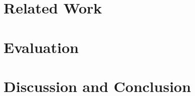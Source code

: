 \documentclass[10pt,b5paper,twoside]{book}
\begin{document}
    \setcounter{page}{1}

     
    \cleardoublepage

     
    \cleardoublepage

     
    \cleardoublepage
    
    \tableofcontents 
    \listoffigures 
    \listoftables 
    \lstlistoflistings 

    \cleardoublepage
    \setcounter{page}{1}
    

    

    \part{Related Work}
    
    
    

    \part{Evaluation}
    
    
    
    
    

    \part{Discussion and Conclusion}
    
    



    
    

    \begin{appendices}
    
    
    \end{appendices}
\end{document}
